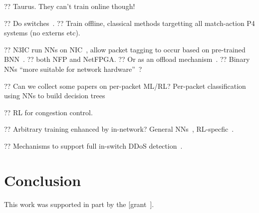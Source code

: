 \documentclass[sigconf,natbib=false]{acmart}
\begin{document}
?? Taurus. They can't train online though!~\parencite{DBLP:journals/corr/abs-2002-08987}

?? Do switches~\parencite{DBLP:conf/hotnets/XiongZ19}.
?? Train offline, classical methods targetting all match-action P4 systems (no externs etc).

?? N3IC run NNs on NIC~\parencite{DBLP:journals/corr/abs-2009-02353}, allow packet tagging to occur based on pre-trained BNN~\parencite{DBLP:conf/nips/HubaraCSEB16}.
?? both NFP and NetFPGA.
?? Or as an offload mechanism~\parencite{DBLP:conf/sigcomm/SanvitoSB18,DBLP:journals/corr/abs-1801-05731}.
?? Binary NNs ``more suitable for network hardware''~\parencite{DBLP:journals/corr/MiyashitaLM16}?

?? Can we collect some papers on per-packet ML/RL? Per-packet classification using NNs to build decision trees~\parencite{DBLP:conf/sigcomm/LiangZJS19}

?? RL for congestion control. ~\parencite{DBLP:journals/corr/abs-1910-04054}

?? Arbitrary training enhanced by in-network? General NNs~\parencite{DBLP:conf/micro/LiPAYQPWSEK18}, RL-specfic~\parencite{DBLP:conf/isca/LiLYCSH19}.

?? Mechanisms to support full in-switch DDoS detection~\cite{tnms-ddos-victim-ident}.

\section{Conclusion}

\begin{acks}
	This work was supported in part by the  [grant~].
\end{acks}
	
%
%
\printbibliography
	
\end{document}
